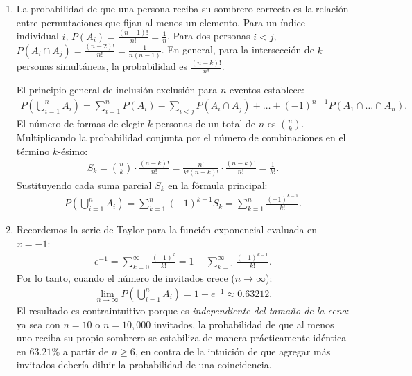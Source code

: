 \begin{solproblema}[prob:a4ff50c]
	\begin{enumerate}
		\item La probabilidad de que una persona reciba su sombrero correcto es la relación entre permutaciones que fijan al menos un elemento. Para un índice individual $i$, $P(A_i) = \frac{(n-1)!}{n!} = \frac{1}{n}$. Para dos personas $i < j$, $P(A_i \cap A_j) = \frac{(n-2)!}{n!} = \frac{1}{n(n-1)}$. En general, para la intersección de $k$ personas simultáneas, la probabilidad es $\frac{(n-k)!}{n!}$.

		El principio general de inclusión-exclusión para $n$ eventos establece:
		\begin{align}
			P\left( \bigcup_{i=1}^{n} A_i \right) = \sum_{i=1}^n P(A_i) - \sum_{i<j} P(A_i \cap A_j) + \dots + (-1)^{n-1} P(A_1 \cap \dots \cap A_n).
		\end{align}
		El número de formas de elegir $k$ personas de un total de $n$ es $\binom{n}{k}$. Multiplicando la probabilidad conjunta por el número de combinaciones en el término $k$-ésimo:
		\begin{align}
			S_k = \binom{n}{k} \cdot \frac{(n-k)!}{n!} = \frac{n!}{k!(n-k)!} \cdot \frac{(n-k)!}{n!} = \frac{1}{k!}.
		\end{align}
		Sustituyendo cada suma parcial $S_k$ en la fórmula principal:
		\begin{align}
			P\left( \bigcup_{i=1}^{n} A_i \right) = \sum_{k=1}^{n} (-1)^{k-1} S_k = \sum_{k=1}^{n} \frac{(-1)^{k-1}}{k!}.
		\end{align}

		\item Recordemos la serie de Taylor para la función exponencial evaluada en $x = -1$:
		\begin{align}
			e^{-1} = \sum_{k=0}^{\infty} \frac{(-1)^k}{k!} = 1 - \sum_{k=1}^{\infty} \frac{(-1)^{k-1}}{k!}.
		\end{align}
		Por lo tanto, cuando el número de invitados crece ($n \to \infty$):
		\begin{align}
			\lim_{n \to \infty} P\left( \bigcup_{i=1}^{n} A_i \right) = 1 - e^{-1} \approx 0.63212.
		\end{align}
		El resultado es contraintuitivo porque es \emph{independiente del tamaño de la cena}: ya sea con $n=10$ o $n=10{,}000$ invitados, la probabilidad de que al menos uno reciba su propio sombrero se estabiliza de manera prácticamente idéntica en $63.21\%$ a partir de $n \ge 6$, en contra de la intuición de que agregar más invitados debería diluir la probabilidad de una coincidencia.
	\end{enumerate}
\end{solproblema}

